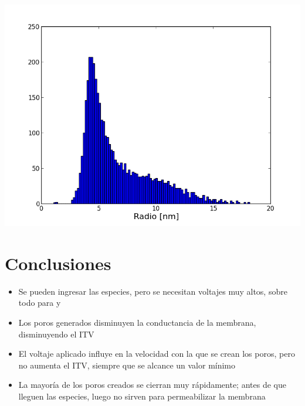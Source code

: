 \documentclass[a0,portrait]{a0poster}
\begin{document}
\begin{multicols}{2}
\begin{center}\vspace{1cm}
\includegraphics[width=0.8\linewidth]{hist-radios-5e-6-50-64-120KVm}
\end{center}\vspace{1cm}

\section*{Conclusiones}
			\begin{itemize}
				\item Se pueden ingresar las especies, pero se necesitan voltajes muy altos,
					sobre todo para \na y \cl
				\item Los poros generados disminuyen la conductancia de la membrana, 
					disminuyendo el ITV
				\item El voltaje aplicado influye en la velocidad con la que se crean los poros,
					pero no aumenta el ITV, siempre que se alcance un valor mínimo
				\item La mayoría de los poros creados se cierran muy rápidamente; antes de que 
					lleguen las especies, luego no sirven para permeabilizar la membrana
			\end{itemize}




\end{multicols}
\end{document}
